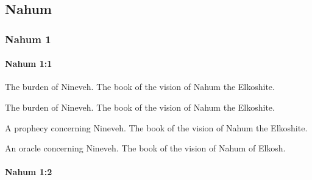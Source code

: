 \subsection{Nahum}
	\label{NAHUM}

	\subsubsection{Nahum 1} %
		\label{NAHUM-1}

		\paragraph{Nahum 1:1} %
			\label{NAHUM-1-1}

			The burden of Nineveh. The book of the vision of Nahum the Elkoshite.

			\begin{versebox}
					\item[BHS] 
					\item[LXX] 
					\item[ASV] The burden of Nineveh. The book of the vision of Nahum the Elkoshite.
					\item[NIV] A prophecy concerning Nineveh. The book of the vision of Nahum the Elkoshite.
					\item[NRSV] An oracle concerning Nineveh. The book of the vision of Nahum of Elkosh.
			\end{versebox}

		\paragraph{Nahum 1:2} %
			\label{NAHUM-1-2}

